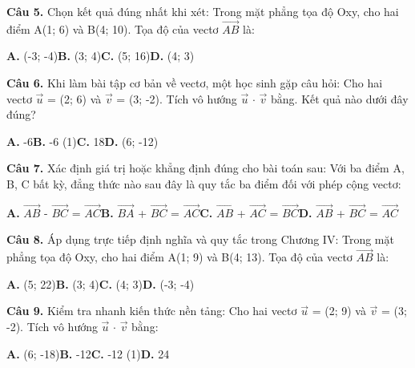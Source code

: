 \documentclass[11pt,a4paper]{article}
\begin{document}
\textbf{\color{primary} Câu 5.} Chọn kết quả đúng nhất khi xét: Trong mặt phẳng tọa độ Oxy, cho hai điểm A(1; 6) và B(4; 10). Tọa độ của vectơ $\overrightarrow{AB}$ là:\par
\hspace*{1.5em}\textbf{A.} (-3; -4)\quad\quad \textbf{B.} (3; 4)\quad\quad \textbf{C.} (5; 16)\quad\quad \textbf{D.} (4; 3)\par\vspace{2pt}
\textbf{\color{primary} Câu 6.} Khi làm bài tập cơ bản về vectơ, một học sinh gặp câu hỏi: Cho hai vectơ $\vec{u}$ = (2; 6) và $\vec{v}$ = (3; -2). Tích vô hướng $\vec{u}$ $\cdot$ $\vec{v}$ bằng. Kết quả nào dưới đây đúng?\par
\hspace*{1.5em}\textbf{A.} -6\quad\quad \textbf{B.} -6 (1)\quad\quad \textbf{C.} 18\quad\quad \textbf{D.} (6; -12)\par\vspace{2pt}
\textbf{\color{primary} Câu 7.} Xác định giá trị hoặc khẳng định đúng cho bài toán sau: Với ba điểm A, B, C bất kỳ, đẳng thức nào sau đây là quy tắc ba điểm đối với phép cộng vectơ:\par
\hspace*{1.5em}\textbf{A.} $\overrightarrow{AB}$ - $\overrightarrow{BC}$ = $\overrightarrow{AC}$\quad\quad \textbf{B.} $\overrightarrow{BA}$ + $\overrightarrow{BC}$ = $\overrightarrow{AC}$\quad\quad \textbf{C.} $\overrightarrow{AB}$ + $\overrightarrow{AC}$ = $\overrightarrow{BC}$\quad\quad \textbf{D.} $\overrightarrow{AB}$ + $\overrightarrow{BC}$ = $\overrightarrow{AC}$\par\vspace{2pt}
\textbf{\color{primary} Câu 8.} Áp dụng trực tiếp định nghĩa và quy tắc trong Chương IV: Trong mặt phẳng tọa độ Oxy, cho hai điểm A(1; 9) và B(4; 13). Tọa độ của vectơ $\overrightarrow{AB}$ là:\par
\hspace*{1.5em}\textbf{A.} (5; 22)\quad\quad \textbf{B.} (3; 4)\quad\quad \textbf{C.} (4; 3)\quad\quad \textbf{D.} (-3; -4)\par\vspace{2pt}
\textbf{\color{primary} Câu 9.} Kiểm tra nhanh kiến thức nền tảng: Cho hai vectơ $\vec{u}$ = (2; 9) và $\vec{v}$ = (3; -2). Tích vô hướng $\vec{u}$ $\cdot$ $\vec{v}$ bằng:\par
\hspace*{1.5em}\textbf{A.} (6; -18)\quad\quad \textbf{B.} -12\quad\quad \textbf{C.} -12 (1)\quad\quad \textbf{D.} 24\par\vspace{2pt}
\end{document}
